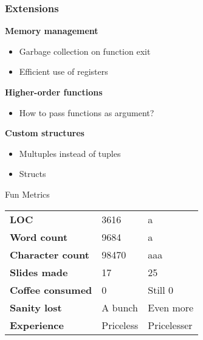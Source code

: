 \documentclass{beamer}
\begin{document}
\begin{frame}
\frametitle{Extensions}
\textbf{Memory management}
\begin{itemize}
\item Garbage collection on function exit
\item Efficient use of registers
\end{itemize}
\textbf{Higher-order functions}
\begin{itemize}
\item How to pass functions as argument?
\end{itemize}
\textbf{Custom structures}
\begin{itemize}
\item Multuples instead of tuples
\item Structs
\end{itemize}
\end{frame}

\begin{frame}
\begin{block}{Fun Metrics}
\begin{tabular}{l || l | l}
\textbf{LOC} & 3616 & a\\
\textbf{Word count} & 9684 & a\\
\textbf{Character count} & 98470 & aaa \\
\textbf{Slides made} & 17 & 25\\
\textbf{Coffee consumed} & 0 & Still 0\\
\textbf{Sanity lost} & A bunch & Even more \\
\textbf{Experience} & Priceless & Pricelesser
\end{tabular}
\end{block}
\end{frame}

\begin{frame}
\end{frame}
\end{document}

